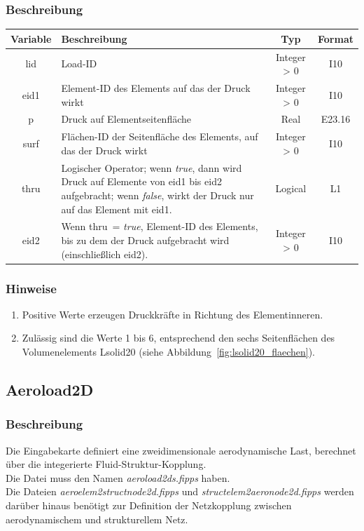 \documentclass[11pt,titlepage,listof=totoc,bibliography=totoc,twoside]{scrreprt}
\begin{document}
{{\subsubsection{Beschreibung}

\begin{tabularx}{\textwidth}{cXcc}
\toprule
Variable  & Beschreibung  & Typ          & Format  \\
\midrule
lid       & Load-ID       & Integer > 0  & I10     \\
eid1      & Element-ID des Elements auf das der Druck wirkt & Integer > 0 & I10  \\
p         & Druck auf Elementseitenfläche & Real & E23.16  \\
surf      & Flächen-ID der Seitenfläche des Elements, auf das der Druck wirkt & Integer > 0 & I10  \\
thru      & Logischer Operator; wenn \emph{true}, dann wird Druck auf Elemente von eid1 bis eid2 aufgebracht; wenn \emph{false}, wirkt der Druck nur auf das Element mit eid1. & Logical & L1  \\
eid2      & Wenn thru~= \emph{true}, Element-ID des Elements, bis zu dem der Druck aufgebracht wird (einschließlich eid2). & Integer > 0 & I10 \\
\bottomrule
\end{tabularx}

\subsubsection{Hinweise}

\begin{enumerate}
\item Positive Werte erzeugen Druckkräfte in Richtung des Elementinneren.
\item Zulässig sind die Werte 1 bis 6, entsprechend den sechs Seitenflächen des Volumenelements Lsolid20 (siehe Abbildung~\ref{fig:lsolid20_flaechen}).
\end{enumerate}

\newpage

\subsection{Aeroload2D}

\subsubsection{Beschreibung}

Die Eingabekarte definiert eine zweidimensionale aerodynamische Last, berechnet über die integerierte Fluid-Struktur-Kopplung.\\
Die Datei muss den Namen \emph{aeroload2ds.fipps} haben.\\
Die Dateien \emph{aeroelem2structnode2d.fipps} und \emph{structelem2aeronode2d.fipps} werden darüber hinaus benötigt zur Definition der Netzkopplung zwischen aerodynamischem und strukturellem Netz.

}}
\end{document}
